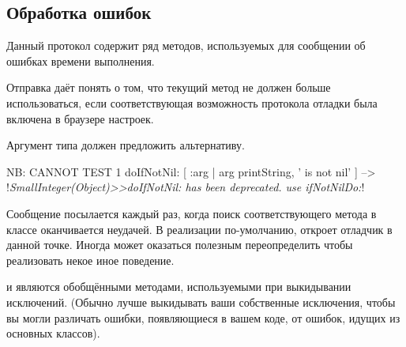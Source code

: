 \documentclass[a4paper,10pt,twoside]{book}
\begin{document}
\subsection{Обработка ошибок}

Данный протокол содержит ряд методов, используемых для сообщении об ошибках времени выполнения.

Отправка  даёт понять о том, что текущий метод не должен больше использоваться, если соответствующая возможность протокола отладки была включена в браузере настроек.  

Аргумент типа  должен предложить альтернативу.

\begin{code}{NB: CANNOT TEST}
1 doIfNotNil: [ :arg | arg printString, ' is not nil' ]
	--> !\emph{SmallInteger(Object)>>doIfNotNil: has been deprecated. use ifNotNilDo:}!
\end{code}

Сообщение  посылается каждый раз, когда поиск соответствующего метода в классе оканчивается неудачей. В реализации по-умолчанию, \ie {} откроет отладчик в данной точке. Иногда может оказаться полезным переопределить  чтобы реализовать некое иное поведение.


 и  являются обобщёнными методами, используемыми при выкидывании исключений.
(Обычно лучше выкидывать ваши собственные исключения, чтобы вы могли различать ошибки, появляющиеся в вашем коде, от ошибок, идущих из основных классов).
\end{document}

